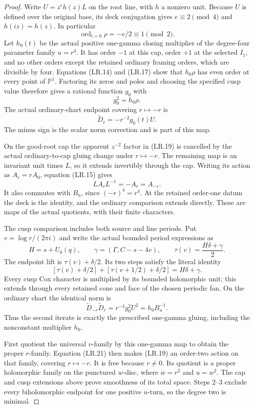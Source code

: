 \begin{proof}
Write $U=z^eh(z)L$ on the root line, with $h$ a nonzero unit.
Because $U$ is defined over the original base, its deck
conjugation gives $e\equiv2\pmod4$ and $h(iz)=h(z)$.
In particular
\[
                    \operatorname{ord}_{t=0}\rho=-e/2
                         \equiv1\pmod2.\tag{LR.17}
\]
Let $h_0(t)$ be the actual positive one-gamma closing multiplier
of the degree-four parameter family $u=r^4$. It has order
$-1$ at this cap, order $+1$ at the selected $I_1$, and no
other orders except the retained ordinary framing orders,
which are divisible by four. Equations (LR.14) and (LR.17)
show that $h_0\rho$ has even order at every point of
$\mathbb P^1$. Factoring its zeros and poles and choosing the
specified cusp value therefore gives a rational function
$g_0$ with
\[
                             g_0^2=h_0\rho.\tag{LR.18}
\]
The actual ordinary-chart endpoint covering $r\mapsto-r$ is
\[
                    \widetilde D_r=-r^{-2}g_0(t)U.\tag{LR.19}
\]
The minus sign is the scalar norm correction and is part of
this map.

On the good-root cap the apparent $z^{-2}$ factor in
(LR.19) is cancelled by the actual ordinary-to-cap gluing
change under $r\mapsto-r$. The remaining map is an invariant
unit times $L$, so it extends invertibly through the cap.
Writing its action as $A_r=rA_0$, equation (LR.15) gives
\[
               LA_rL^{-1}=-A_r=A_{-r}.\tag{LR.20}
\]
It also commutes with $B_u$, since $(-r)^4=r^4$.
At the retained order-one datum the deck is the identity,
and the ordinary comparison extends directly. These are
maps of the actual quotients, with their finite characters.

The cusp comparison includes both source and line periods.
Put $v=\log r/(2\pi i)$ and write the actual bounded period
expressions as
\[
 H=s+U_0(q),\qquad
 \gamma=(\Gamma,C-s-4v),\qquad
 \tau(v)=\frac{H\delta+\gamma}{2}.
\]
The endpoint lift is $\tau(v)+\delta/2$.
Its two steps satisfy the literal identity
\[
 [\tau(v)+\delta/2]+[\tau(v+1/2)+\delta/2]
                       =H\delta+\gamma.\tag{LR.21}
\]
Every cusp Cox character is multiplied by its bounded
holomorphic unit; this extends through every retained cone
and face of the chosen periodic fan. On the ordinary chart
the identical norm is
\[
 \widetilde D_{-r}\widetilde D_r
    =r^{-4}g_0^2U^2
    =h_0 B_u^{-1}.\tag{LR.22}
\]
Thus the second iterate is exactly the prescribed one-gamma
gluing, including the nonconstant multiplier $h_0$.

First quotient the universal $v$-family by this one-gamma
map to obtain the proper $r$-family. Equation (LR.21) then
makes (LR.19) an order-two action on that family, covering
$r\mapsto-r$. It is free because $r\ne0$. Its quotient
is a proper holomorphic family on the punctured $w$-disc,
where $w=r^2$ and $u=w^2$. The cap and cusp extensions above
prove smoothness of its total space. Steps 2--3 exclude
every biholomorphic endpoint for one positive $u$-turn, so
the degree two is minimal.
\end{proof}

